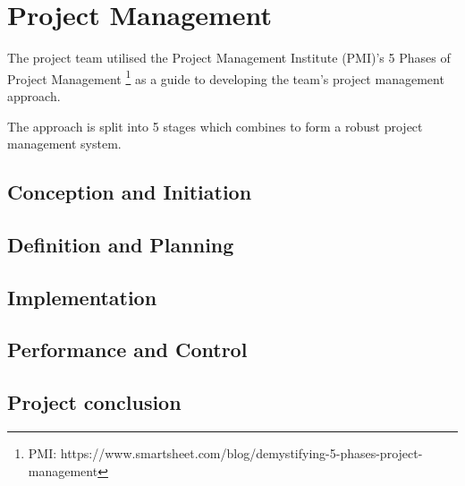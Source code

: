 \documentclass[11pt, a4paper]{article}
\begin{document}
\tableofcontents
\pagebreak

\section{Project Management}

The project team utilised the Project Management Institute (PMI)'s 5 Phases of Project Management \footnote{PMI: https://www.smartsheet.com/blog/demystifying-5-phases-project-management} as a guide to developing the team's project management approach. 

The approach is split into 5 stages which combines to form a robust project management system.

\subsection{Conception and Initiation}





\subsection{Definition and Planning}




\subsection{Implementation}




\subsection{Performance and Control}




\subsection{Project conclusion}



\vfill
\end{document}
